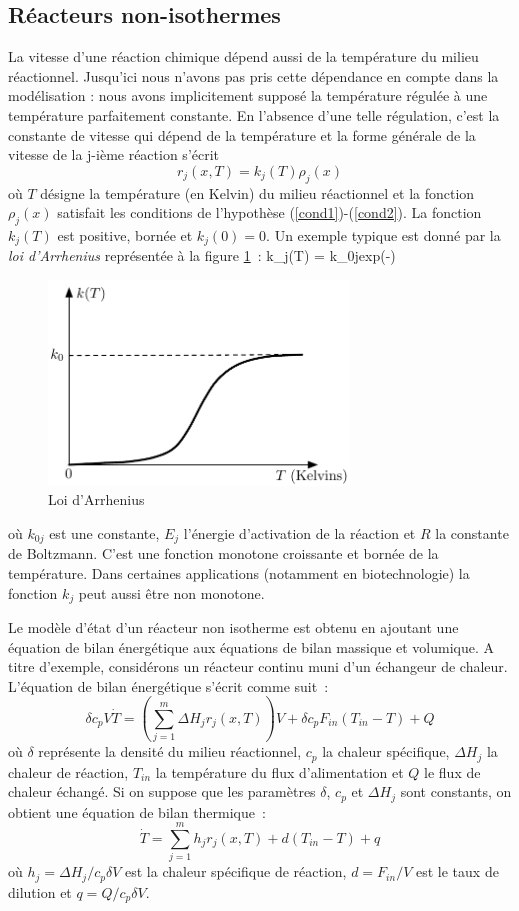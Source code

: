 \subsection{Réacteurs non-isothermes}

La vitesse d'une réaction chimique dépend aussi de la
température du milieu réactionnel. Jusqu'ici nous n'avons pas
pris cette dépendance en compte dans la modélisation : nous
avons implicitement supposé la température régulée à une
température parfaitement constante. En l'absence d'une telle
régulation, c'est la constante de vitesse qui dépend de la
température et la forme générale de la vitesse de la j-ième
réaction s'écrit
$$
r_j(x,T) = k_j(T)\rho_j(x)
$$
où $T$ désigne la température (en Kelvin) du milieu
réactionnel et la fonction $\rho_j(x)$ satisfait les conditions de
l'hypothèse (\ref{cond1})-(\ref{cond2}). La fonction $k_j(T)$ est
positive, bornée et $k_j(0) = 0$. Un exemple typique est donné
par la {\it loi d'Arrhenius} représentée à la figure
\ref{Fig:arrhenius}~: \eqnn
k_j(T) = k_{0j}exp(-)
\eeqnn
\begin{figure}[htbp] 
   \centering
   \includegraphics[width=8cm]{arrhenius} 
   \caption{Loi d'Arrhenius}
   \label{Fig:arrhenius}
\end{figure}
où $k_{0j}$ est une constante, $E_j$ l'énergie d'activation de la
réaction et $R$ la constante de Boltzmann. C'est une fonction
monotone croissante et bornée de la température. Dans
certaines applications (notamment en biotechnologie) la
fonction $k_j$ peut aussi être non monotone.

Le modèle d'état d'un réacteur non isotherme est obtenu en
ajoutant une équation de bilan énergétique aux équations de
bilan massique et volumique. A titre d'exemple, considérons un
réacteur continu muni d'un échangeur de chaleur.
L'équation de bilan énergétique s'écrit comme suit~:
$$
\delta c_p V\dot T = (\sum_{j=1}^{m}\Delta H_j r_j(x,T))V +
\delta c_p F_{in} (T_{in} - T) + Q
$$
où $\delta$ représente la densité du milieu réactionnel, $c_p$ la chaleur
spécifique, $\Delta H_j$ la chaleur de réaction, $T_{in}$ la
température du flux d'alimentation et $Q$ le flux de
chaleur échangé. Si on suppose que les paramètres $\delta$,
$c_p$ et $\Delta H_j$ sont constants, on obtient une équation
de bilan thermique~: 
$$ 
\dot T = \sum_{j=1}^{m} h_j r_j(x,T) +
d(T_{in} - T) + q
$$
où $h_j = \Delta H_j/c_p\delta V$ est la chaleur spécifique de
réaction, $d = F_{in}/V$ est le taux de dilution et $q =
Q/c_p \delta V$.

